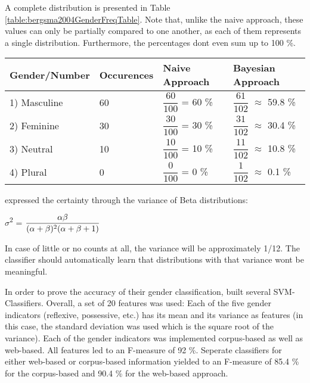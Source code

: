 A complete distribution is presented in Table \ref{table:bergsma2004GenderFreqTable}. Note that, unlike the naive approach, these values can only be partially compared to one another, as each of them represents a single distribution. Furthermore, the percentages dont even sum up to 100 \%.

\begin{center}
    \renewcommand{\arraystretch}{2.0}
    \begin{tabular}{| l | l | l | l |}
    \hline
    Gender/Number & Occurences & Naive Approach & Bayesian Approach \\ \hline
\hline
    1) Masculine & 60 & $\dfrac{60}{100}$ = 60 \% &  $\dfrac{61}{102}$ $\approx$ 59.8 \% \\ \hline
    2) Feminine & 30 &  $\dfrac{30}{100}$ = 30 \% &  $\dfrac{31}{102}$ $\approx$ 30.4 \% \\ \hline
    3) Neutral & 10 & $\dfrac{10}{100}$ = 10 \% & $\dfrac{11}{102}$ $\approx$ 10.8 \%  \\ \hline
    4) Plural & 0 &    $\dfrac{0}{100}$ =  0 \% &  $\dfrac{1}{102}$ $\approx$ 0.1 \% \\ \hline
    \end{tabular}
     \label{table:bergsma2004GenderFreqTable}
\end{center}

 \cite{bergsma2005automatic} expressed the certainty through the variance of Beta distributions:

\begin{center}
	$\sigma$\textsuperscript{2} =  $\dfrac{\alpha \beta }{(\alpha + \beta)\textsuperscript{2}(\alpha + \beta + 1)}$
\end{center}

In case of little or no counts at all, the variance will be approximately 1/12. The classifier should automatically learn that distributions with that variance wont be meaningful.

In order to prove the accuracy of their gender classification, \cite{bergsma2005automatic} built several SVM-Classifiers. Overall, a set of 20 features was used: Each of the five gender indicators (reflexive, possessive, etc.) has its mean and its variance as features (in this case, the standard deviation was used which is the square root of the variance). Each of the gender indicators was implemented corpus-based as well as web-based. All features led to an F-measure of 92 \%. Seperate classifiers for either web-based or corpus-based information yielded to an F-measure of 85.4 \% for the corpus-based and 90.4 \% for the web-based approach.

